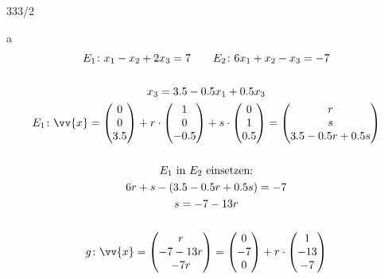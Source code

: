 \begin{exercise}{333/2}
  \item [a]
  \begin{gather*}
    E_1 \colon x_1 - x_2 + 2x_3 = 7 \qquad E_2 \colon 6x_1 + x_2 - x_3 = -7 \\\\
    x_3 = 3.5 - 0.5x_1 + 0.5x_3 \\
    E_1 \colon \vv{x} = \begin{pmatrix}0 \\ 0 \\ 3.5\end{pmatrix} + r \cdot \begin{pmatrix}1 \\ 0 \\ -0.5\end{pmatrix} + s \cdot \begin{pmatrix}0 \\ 1 \\ 0.5\end{pmatrix} = \begin{pmatrix}r \\ s \\ 3.5 - 0.5r + 0.5s\end{pmatrix} \\\\
    \text{$E_1$ in $E_2$ einsetzen:} \\
    6r + s - (3.5 - 0.5r + 0.5s) = -7 \\
    s = -7 - 13r \\\\
    g \colon \vv{x} = \begin{pmatrix}r \\ -7 - 13r \\ -7r\end{pmatrix} = \begin{pmatrix}0 \\ -7 \\ 0\end{pmatrix} + r \cdot \begin{pmatrix}1 \\ -13 \\ -7\end{pmatrix}
  \end{gather*}
\end{exercise}
\newpage
